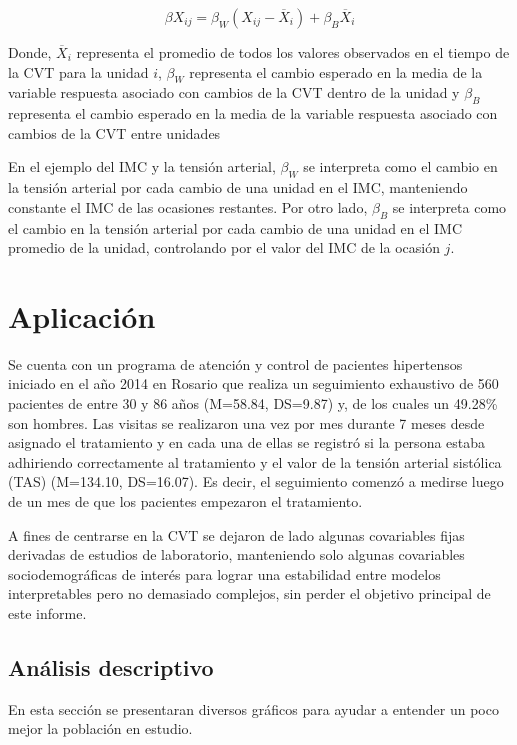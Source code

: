 \documentclass[spanish]{article}
\numberwithin{figure}{subsection}
\numberwithin{equation}{subsection}
\numberwithin{table}{subsection}
\def\npatients{560}
\begin{document}
\[ \beta X_{ij} = \beta_W (X_{ij} - \overline{X}_i) + \beta_B \overline{X}_i \]

Donde, $\overline{X}_i$ representa el promedio de todos los valores observados
en el tiempo de la CVT para la unidad $i$, $\beta_W$ representa el cambio
esperado en la media de la variable respuesta asociado con cambios de la CVT
dentro de la unidad y $\beta_B$ representa el cambio esperado en la media de
la variable respuesta asociado con cambios de la CVT entre unidades

En el ejemplo del IMC y la tensión arterial, $\beta_W$ se interpreta como el
cambio en la tensión arterial por cada cambio de una unidad en el IMC,
manteniendo constante el IMC de las ocasiones restantes. Por otro lado,
$\beta_B$ se interpreta como el cambio en la tensión arterial por cada cambio de
una unidad en el IMC promedio de la unidad, controlando por el valor del IMC de
la ocasión $j$.

\newpage

\section{Aplicación}

Se cuenta con un programa de atención y control de pacientes hipertensos
iniciado en el año 2014 en Rosario que realiza un seguimiento exhaustivo de
\npatients{} pacientes de entre 30 y 86 años (M=58.84, DS=9.87) y, de los cuales
un 49.28\% son hombres. Las visitas se realizaron una vez por mes durante 7
meses desde asignado el tratamiento y en cada una de ellas se registró si la
persona estaba adhiriendo correctamente al tratamiento y el valor de la tensión
arterial sistólica (TAS) (M=134.10, DS=16.07). Es decir, el seguimiento comenzó
a medirse luego de un mes de que los pacientes empezaron el tratamiento.

A fines de centrarse en la CVT se dejaron de lado algunas covariables fijas
derivadas de estudios de laboratorio, manteniendo solo algunas covariables
sociodemográficas de interés para lograr una estabilidad entre modelos
interpretables pero no demasiado complejos, sin perder el objetivo principal de
este informe.

\subsection{Análisis descriptivo}

En esta sección se presentaran diversos gráficos para ayudar a entender un poco
mejor la población en estudio.
\end{document}
